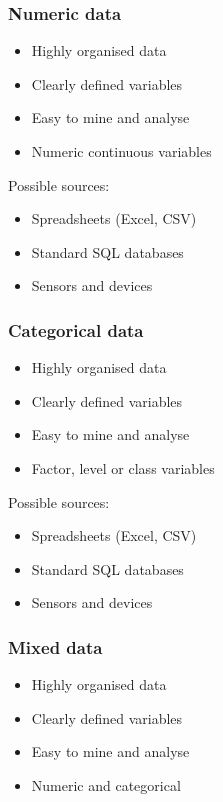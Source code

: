 \documentclass[11pt]{article}
\begin{document}
\subsubsection{Numeric data}
\label{sec:orgc37b80e}
\begin{itemize}
\item Highly organised data
\item Clearly defined variables
\item Easy to mine and analyse
\item Numeric continuous variables
\end{itemize}

Possible sources:
\begin{itemize}
\item Spreadsheets (Excel, CSV)
\item Standard SQL databases
\item Sensors and devices
\end{itemize}
\subsubsection{Categorical data}
\label{sec:org14439c5}
\begin{itemize}
\item Highly organised data
\item Clearly defined variables
\item Easy to mine and analyse
\item Factor, level or class variables
\end{itemize}

Possible sources:
\begin{itemize}
\item Spreadsheets (Excel, CSV)
\item Standard SQL databases
\item Sensors and devices
\end{itemize}
\subsubsection{Mixed data}
\label{sec:org80fbc76}
\begin{itemize}
\item Highly organised data
\item Clearly defined variables
\item Easy to mine and analyse
\item Numeric and categorical
\end{itemize}
\end{document}
